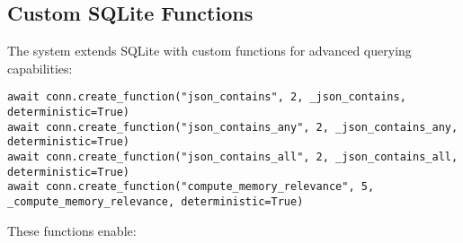 \documentclass[12pt,a4paper]{article}
\begin{document}
\subsection*{Custom SQLite Functions}

The system extends SQLite with custom functions for advanced querying capabilities:
\begin{pageablecode}
\begin{verbatim}
await conn.create_function("json_contains", 2, _json_contains, deterministic=True)
await conn.create_function("json_contains_any", 2, _json_contains_any, deterministic=True)
await conn.create_function("json_contains_all", 2, _json_contains_all, deterministic=True)
await conn.create_function("compute_memory_relevance", 5, _compute_memory_relevance, deterministic=True)
\end{verbatim}
\end{pageablecode}
These functions enable:
\end{document}
